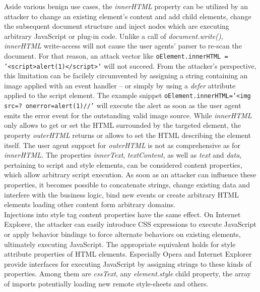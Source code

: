       Aside various benign use cases, the \textit{innerHTML} property can be utilized by an attacker to change an existing element's content and add child elements, change the subsequent document structure and inject nodes which are executing arbitrary JavaScript or plug-in code. Unlike a call of \textit{document.write()}, \textit{innerHTML} write-access will not cause the user agents' parser to re-scan the document. For that reason, an attack vector like \texttt{oElement.innerHTML = '<script>alert(1)</script>'} will not succeed. From the attacker's perspective, this limitation can be facilely circumvented by assigning a string containing an image applied with an event handler -- or simply by using a \textit{defer} attribute applied to the script element. The example snippet \texttt{oElement.innerHTML='<img src=? onerror=alert(1)//'} will execute the alert as soon as the user agent emits the error event for the outstanding valid image source. While \textit{innerHTML} only allows to get or set the HTML surrounded by the targeted element, the property \textit{outerHTML} returns or allows to set the HTML describing the element itself. The user agent support for \textit{outerHTML} is not as comprehensive as for \textit{innerHTML}. The properties \textit{innerText}, \textit{textContent}, as well as \textit{text} and \textit{data}, pertaining to script and style elements, can be considered content properties, which allow arbitrary script execution. As soon as an attacker can influence these properties, it becomes possible to concatenate strings, change existing data and interfere with the business logic, bind new events or create arbitrary HTML elements loading other content form arbitrary domains. \\

      Injections into style tag content properties have the same effect. On Internet Explorer, the attacker can easily introduce CSS expressions to execute JavaScript or apply behavior bindings to force alternate behaviors on existing elements, ultimately executing JavaScript. The appropriate equivalent holds for style attribute properties of HTML elements. Especially Opera and Internet Explorer provide interfaces for executing JavaScript by assigning strings to these kinds of properties. Among them are \textit{cssText}, any \textit{element.style} child property, the array of imports potentially loading new remote style-sheets and others. \\

